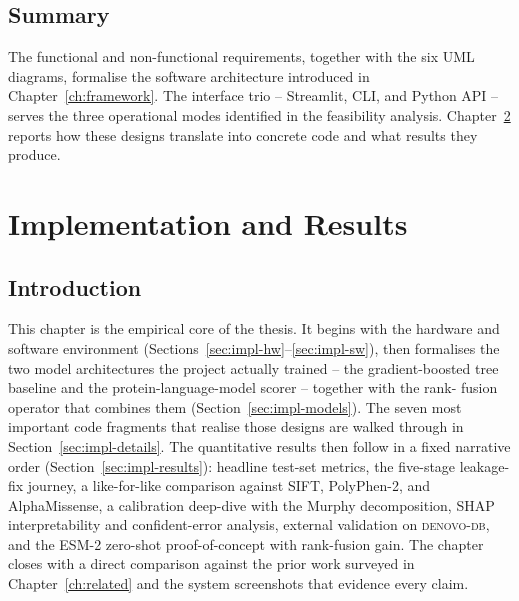 \documentclass[11pt,a4paper,oneside]{report}
\begin{document}
\section{Summary}
\label{sec:an-summary}

The functional and non-functional requirements,
together with the six UML diagrams, formalise the
software architecture introduced in
Chapter~\ref{ch:framework}. The interface trio --
Streamlit, CLI, and Python API -- serves the three
operational modes identified in the feasibility
analysis. Chapter~\ref{ch:implementation} reports
how these designs translate into concrete code and
what results they produce.


\chapter{Implementation and Results}
\label{ch:implementation}

\section{Introduction}
\label{sec:impl-intro}

This chapter is the empirical core of the thesis. It begins
with the hardware and software environment
(Sections~\ref{sec:impl-hw}--\ref{sec:impl-sw}), then
formalises the two model architectures the project actually
trained -- the gradient-boosted tree baseline and the
protein-language-model scorer -- together with the rank-
fusion operator that combines them
(Section~\ref{sec:impl-models}). The seven most important
code fragments that realise those designs are walked through
in Section~\ref{sec:impl-details}. The quantitative results
then follow in a fixed narrative order
(Section~\ref{sec:impl-results}): headline test-set metrics,
the five-stage leakage-fix journey, a like-for-like
comparison against SIFT, PolyPhen-2, and AlphaMissense, a
calibration deep-dive with the Murphy decomposition, SHAP
interpretability and confident-error analysis, external
validation on \textsc{denovo-db}, and the ESM-2 zero-shot
proof-of-concept with rank-fusion gain. The chapter closes
with a direct comparison against the prior work surveyed in
Chapter~\ref{ch:related} and the system screenshots that
evidence every claim.
\end{document}
